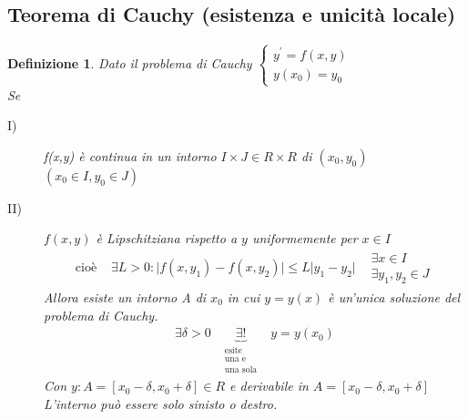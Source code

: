 \documentclass{book}
\newtheorem{defi}{Definizione}
\newcommand{\abs}[1]{\lvert#1\rvert}
\begin{document}
\subsection{Teorema di Cauchy (esistenza e unicità locale)\label{tcauchy}}
\begin{defi}
  Dato il problema di Cauchy $\begin{cases}y^\prime=f(x,y)\\ y(x_0)=y_0\end{cases}$\\
  Se
  \begin{description}
  \item[I)] f(x,y) è continua in un intorno $I\times J \in R\times R$ di $(x_0,y_0)$
    $(x_0\in I, y_0\in J)$\clearpage
  \item[II)] $f(x,y)$ è Lipschitziana rispetto a $y$ uniformemente per $x \in I$
    \begin{eqnarray*}
      \text{cioè } & \exists L>0:\abs{f(x,y_1)-f(x,y_2)}\leq L\abs{y_1-y_2}
      & \begin{matrix}
          \exists x\in I\\
          \exists y_1, y_2\in J
        \end{matrix}
    \end{eqnarray*}
    Allora esiste un intorno A di $x_0$ in cui $y=y(x)$ è un'unica soluzione del problema
    di Cauchy.
    \begin{eqnarray*}
      \exists \delta >0 & \underbrace{\exists !}_{\begin{matrix} \text{esite} \\
                                                    \text{una e}\\
                                                    \text{una sola} \end{matrix}}
      & y=y(x_0)
    \end{eqnarray*}
    Con $y: A= [x_0-\delta,x_0+\delta]\in R$ e derivabile in
    $A= [x_0-\delta,x_0+\delta]$\\
    L'interno può essere solo sinisto o destro. 
  \end{description}  
\end{defi}

\printindex
\end{document}
